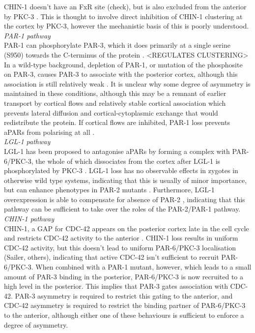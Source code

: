 \documentclass[12pt]{"report"}
\begin{document}
CHIN-1 doesn’t have an FxR site (check), but is also excluded from the anterior by PKC-3 \citep{Sailer2015}. This is thought to involve direct inhibition of CHIN-1 clustering at the cortex by PKC-3, however the mechanistic basis of this is poorly understood.\\

\textit{PAR-1 pathway} \\

PAR-1 can phosphorylate PAR-3, which it does primarily at a single serine (S950) towards the C-terminus of the protein \citep{Motegi2011}. <REGULATES CLUSTERING> In a wild-type background, depletion of PAR-1, or mutation of the phosphosite on PAR-3, causes PAR-3 to associate with the posterior cortex, although this association is still relatively weak \citep{Sailer2015}. It is unclear why some degree of asymmetry is maintained in these conditions, although this may be a remnant of earlier transport by cortical flows and relatively stable cortical association which prevents lateral diffusion and cortical-cytoplasmic exchange that would redistribute the protein. If cortical flows are inhibited, PAR-1 loss prevents aPARs from polarising at all \citep{Motegi2011}.\\

\textit{LGL-1 pathway}\\

LGL-1 has been proposed to antagonise aPARs by forming a complex with PAR-6/PKC-3, the whole of which dissociates from the cortex after LGL-1 is phosphorylated by PKC-3 \citep{Hoege2010}. LGL-1 loss has no observable effects in zygotes in otherwise wild type systems, indicating that this is usually of minor importance, but can enhance phenotypes in PAR-2 mutants \citep{Beatty2010}. Furthermore, LGL-1 overexpression is able to compensate for absence of PAR-2 \citep{Hoege2010}, indicating that this pathway can be sufficient to take over the roles of the PAR-2/PAR-1 pathway.\\

\textit{CHIN-1 pathway}\\

CHIN-1, a GAP for CDC-42 appears on the posterior cortex late in the cell cycle and restricts CDC-42 activity to the anterior \citep{Kumfer2010} \citep{Beatty2013, Sailer2015}. CHIN-1 loss results in uniform CDC-42 activity, but this doesn't lead to uniform PAR-6/PKC-3 localisation (Sailer, others), indicating that active CDC-42 isn’t sufficient to recruit PAR-6/PKC-3. When combined with a PAR-1 mutant, however, which leads to a small amount of PAR-3 binding in the posterior, PAR-6/PKC-3 is now recruited to a high level in the posterior. This implies that PAR-3 gates association with CDC-42. PAR-3 asymmetry is required to restrict this gating to the anterior, and CDC-42 asymmetry is required to restrict the binding partner of PAR-6/PKC-3 to the anterior, although either one of these behaviours is sufficient to enforce a degree of asymmetry.\\
\end{document}
